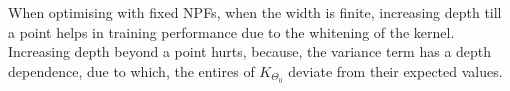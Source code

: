When optimising with fixed NPFs, when the width is finite, increasing depth till a point helps in training performance due to the whitening of the kernel. Increasing depth beyond a point hurts, because, the variance term has a depth dependence, due to which, the entires of $K_{\Theta_0}$ deviate from their expected values.

